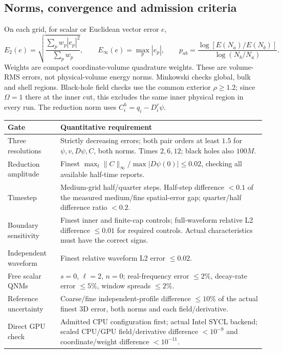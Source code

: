 \documentclass[11pt,letterpaper]{article}
\begin{document}
\clearpage
\subsection{Norms, convergence and admission criteria}
On each grid, for scalar or Euclidean vector error $e$,
\begin{equation}
 E_2(e)=\sqrt{\frac{\sum_p w_p|e_p|^2}{\sum_p w_p}},\qquad
 E_\infty(e)=\max_p|e_p|,\qquad
 p_{ab}=\frac{\log[E(N_a)/E(N_b)]}{\log(N_b/N_a)}.
\end{equation}
Weights are compact coordinate-volume quadrature weights. These are volume-RMS errors, not physical-volume energy norms. Minkowski checks global, bulk and shell regions. Black-hole field checks use the common exterior $\rho\geq1.2$; since $\Omega=1$ there at the inner cut, this excludes the same inner physical region in every run. The reduction norm uses $C_i^h=q_i-D_i^c\psi$.

\begin{center}\small
\begin{tabularx}{\linewidth}{@{}p{3.2cm}X@{}}\toprule
Gate & Quantitative requirement \\\midrule
Three resolutions & Strictly decreasing errors; both pair orders at least $1.5$ for $\psi,v,D\psi,C$, both norms. Times $2,6,12$; black holes also $100M$. \\
Reduction amplitude & Finest $\max_t\|C\|_\infty/\max|D\psi(0)|\leq0.02$, checking all available half-time reports. \\
Timestep & Medium-grid half/quarter steps. Half-step difference $<0.1$ of the measured medium/fine spatial-error gap; quarter/half difference ratio $<0.2$. \\
Boundary sensitivity & Finest inner and finite-cap controls; full-waveform relative L2 difference $\leq0.01$ for required controls. Actual characteristics must have the correct signs. \\
Independent waveform & Finest relative waveform L2 error $\leq0.02$. \\
Free scalar QNMs & $s=0$, $\ell=2$, $n=0$; real-frequency error $\leq2\%$, decay-rate error $\leq5\%$, window spreads $\leq2\%$. \\
Reference uncertainty & Coarse/fine independent-profile difference $\leq10\%$ of the actual finest 3D error, both norms and each field/derivative. \\
Direct GPU check & Admitted CPU configuration first; actual Intel SYCL backend; scaled CPU/GPU field/derivative difference $<10^{-9}$ and coordinate/weight difference $<10^{-11}$. \\\bottomrule
\end{tabularx}
\end{center}
\end{document}
